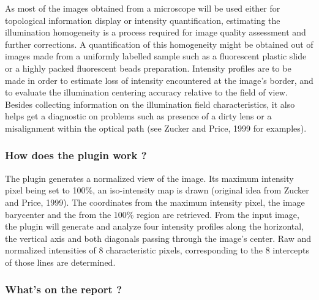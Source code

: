 \documentclass[]{spie}
\begin{document}
As most of the images obtained from a microscope will be used either for topological information display or intensity quantification, estimating the illumination homogeneity is a process required for image quality assessment and further corrections. A quantification of this homogeneity might be obtained out of images made from a uniformly labelled sample such as a fluorescent plastic slide or a highly packed fluorescent beads preparation. Intensity profiles are to be made in order to estimate loss of intensity encountered at the image's border, and to evaluate the illumination centering accuracy relative to the field of view. Besides collecting information on the illumination field characteristics, it also helps get a diagnostic on problems such as presence of a dirty lens or a misalignment within the optical path (see Zucker and Price, 1999\cite{Zucker1999} for examples).


\subsubsection*{How does the plugin work ?}
\label{subsubsec:gfir-pgWork}

The plugin generates a normalized view of the image. Its maximum intensity pixel being set to 100\%, an iso-intensity map is drawn (original idea from Zucker and Price, 1999\cite{Zucker1999}). The coordinates from the maximum intensity pixel, the image barycenter and the from the 100\% region are retrieved. From the input image, the plugin will generate and analyze four intensity profiles along the horizontal, the vertical axis and both diagonals passing through the image's center. Raw and normalized intensities of 8 characteristic pixels, corresponding to the 8 intercepts of those lines are determined.

\subsubsection*{What's on the report ?}
\label{subsubsec:gfir-report}
\end{document}
